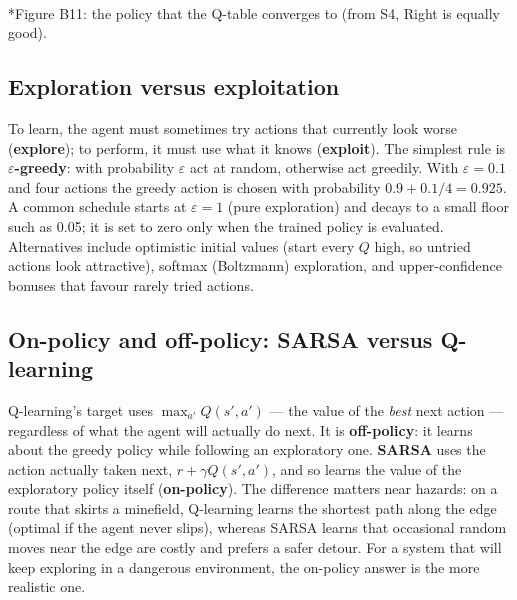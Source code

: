\documentclass[11pt]{article}
\begin{document}
\begin{center}\\*{\small\color{GreyN}Figure B11: the policy that the Q-table converges to (from S4, Right is equally good).}\end{center}

\subsection{Exploration versus exploitation}
To learn, the agent must sometimes try actions that currently look worse (\textbf{explore}); to perform, it must use what it knows (\textbf{exploit}). The simplest rule is \textbf{$\varepsilon$-greedy}: with probability $\varepsilon$ act at random, otherwise act greedily. With $\varepsilon=0.1$ and four actions the greedy action is chosen with probability $0.9+0.1/4=0.925$. A common schedule starts at $\varepsilon=1$ (pure exploration) and decays to a small floor such as 0.05; it is set to zero only when the trained policy is evaluated. Alternatives include optimistic initial values (start every $Q$ high, so untried actions look attractive), softmax (Boltzmann) exploration, and upper-confidence bonuses that favour rarely tried actions.

\subsection{On-policy and off-policy: SARSA versus Q-learning}
Q-learning's target uses $\max_{a'}Q(s',a')$ --- the value of the \emph{best} next action --- regardless of what the agent will actually do next. It is \textbf{off-policy}: it learns about the greedy policy while following an exploratory one. \textbf{SARSA} uses the action actually taken next, $r+\gamma Q(s',a')$, and so learns the value of the exploratory policy itself (\textbf{on-policy}). The difference matters near hazards: on a route that skirts a minefield, Q-learning learns the shortest path along the edge (optimal if the agent never slips), whereas SARSA learns that occasional random moves near the edge are costly and prefers a safer detour. For a system that will keep exploring in a dangerous environment, the on-policy answer is the more realistic one.
\end{document}
